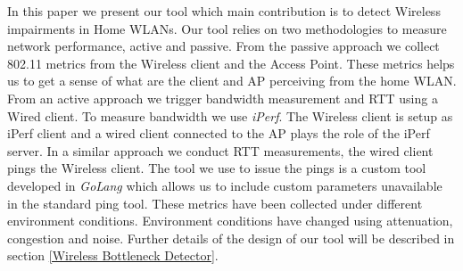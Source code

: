 In this paper we present our tool which main contribution is to detect Wireless impairments in Home WLANs. Our tool relies on two methodologies to measure network performance, active and passive. From the passive approach we collect 802.11 metrics from the Wireless client and the Access Point. These metrics helps us to get a sense of what are the client and AP perceiving from the home WLAN. From an active approach we trigger bandwidth measurement and RTT using a Wired client. To measure bandwidth we use \emph{iPerf}. The Wireless client is setup as iPerf client and a wired client connected to the AP plays the role of the iPerf server. In a similar approach we conduct RTT measurements, the wired client pings the Wireless client. The tool we use to issue the pings is a custom tool developed in \emph{GoLang} which allows us to include custom parameters unavailable in the standard ping tool. These metrics have been collected under different  environment conditions. Environment conditions have changed using attenuation, congestion and noise. Further details of the design of our tool will be described in section \ref{Wireless Bottleneck Detector}. 